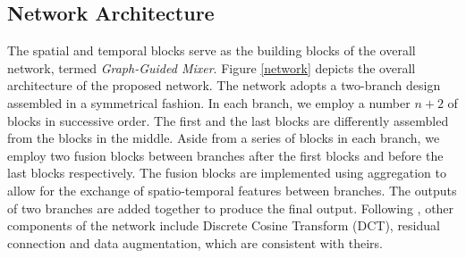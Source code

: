 \documentclass[10pt,twocolumn,letterpaper]{article}
\begin{document}
    
\subsection{Network Architecture}

The spatial and temporal blocks serve as the building blocks of the overall network, termed \textit{Graph-Guided Mixer}.
Figure \ref{network} depicts the overall architecture of the proposed network.
The network adopts a two-branch design assembled in a symmetrical fashion.
In each branch, we employ a number $n+2$ of blocks in successive order. The first and the last blocks are differently assembled from the blocks in the middle.
Aside from a series of blocks in each branch, we employ two fusion blocks between branches after the first blocks and before the last blocks respectively. 
The fusion blocks are implemented using aggregation to allow for the exchange of spatio-temporal features between branches.
The outputs of two branches are added together to produce the final output.
Following \cite{guo2023back}, other components of the network include Discrete Cosine Transform (DCT), residual connection and data augmentation, which are consistent with theirs.
\end{document}
